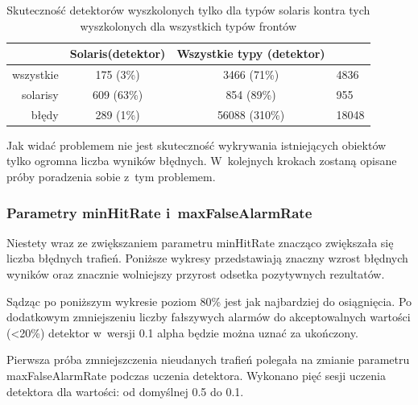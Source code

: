 \begin{table}[!h]
    \centering
    \begin{tabular}{r|c|c|l}
            & Solaris(detektor) & Wszystkie typy (detektor) &           \\
            \hline
wszystkie   & 175 (3\%)         & 3466 (71\%)               & 4836      \\
solarisy    & 609 (63\%)        & 854 (89\%)                & 955       \\
błędy       & 289 (1\%)         & 56088 (310\%)             & 18048     \\
    \end{tabular}
    \caption{Skuteczność detektorów wyszkolonych tylko dla typów solaris kontra tych wyszkolonych dla wszystkich typów frontów}
    \label{tab:sol_vs_all}
\end{table}

Jak widać problemem nie jest skuteczność wykrywania istniejących obiektów
tylko ogromna liczba wyników błędnych. W~kolejnych krokach zostaną opisane
próby poradzenia sobie z~tym problemem.

\subsubsection{Parametry minHitRate i~maxFalseAlarmRate}

Niestety wraz ze zwiększaniem parametru minHitRate znacząco zwiększała
się liczba błędnych trafień. Poniższe wykresy przedstawiają znaczny wzrost
błędnych wyników oraz znacznie wolniejszy przyrost odsetka pozytywnych 
rezultatów.
\begin{center}
\end{center}

Sądząc po poniższym wykresie poziom 80\% jest jak najbardziej do
osiągnięcia. Po dodatkowym zmniejszeniu liczby fałszywych alarmów 
do akceptowalnych wartości (<20\%) detektor w~wersji 0.1 alpha będzie
można uznać za ukończony.

\begin{center}
\end{center}

Pierwsza próba zmniejszczenia nieudanych trafień polegała na zmianie 
parametru maxFalseAlarmRate podczas uczenia detektora. Wykonano pięć
sesji uczenia detektora dla wartości: od domyślnej 0.5 do 0.1.



